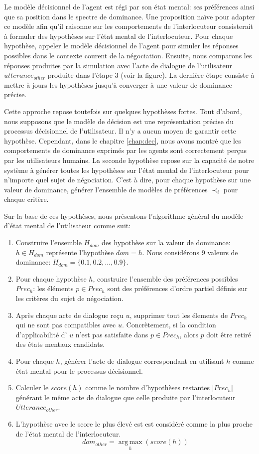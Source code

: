 	Le modèle décisionnel de l'agent est régi par son état mental: ses préférences ainsi que sa position dans le spectre de dominance. Une proposition naïve pour adapter ce modèle afin qu'il raisonne sur les comportements de l'interlocuteur consisterait à formuler des hypothèses sur l'état mental de l'interlocuteur. Pour chaque hypothèse, appeler le modèle décisionnel de l'agent pour simuler les réponses possibles dans le contexte courent de la négociation. Ensuite, nous comparons les réponses produites par la simulation avec l'acte de dialogue de l'utilisateur $utterance_{other}$ produite dans l'étape 3 (voir la figure). 
	La dernière étape consiste à mettre à jours les hypothèses jusqu'à converger à une valeur de dominance précise. 
	
	Cette approche repose toutefois sur quelques hypothèses fortes. Tout d'abord, nous supposons que le modèle de décision est une représentation précise du processus décisionnel de l'utilisateur. Il n'y a aucun moyen de garantir cette hypothèse. Cependant, dans le chapitre \ref{chap:dec}, nous avons montré que les comportements de dominance exprimés par les agents sont correctement perçus par les utilisateurs humains. La seconde hypothèse repose sur la capacité de notre système à générer toutes les hypothèses sur l'état mental de l'interlocuteur pour n'importe quel sujet de négociation. C'est à dire, pour chaque hypothèse sur une valeur de dominance, générer l'ensemble de modèles de préférences $\prec_i$ pour chaque critère.
	
	Sur la base de ces hypothèses, nous présentons l'algorithme général du modèle d'état mental de l'utilisateur comme suit:

		\begin{enumerate}
			\item Construire l'ensemble $H_{dom}$ des hypothèse sur la valeur de dominance: $h\in H_{dom}$ représente l'hypothèse $dom=h$. Nous considérons 9 valeurs de dominance: $H_{dom}=\{0.1, 0.2, \ldots, 0.9\}$.
			\item Pour chaque hypothèse $h$, construire l'ensemble des préférences possibles $Prec_h$: les éléments $p\in Prec_h$ sont des préférences d'ordre partiel définis sur les critères du sujet de négociation.
			
			\item Après chaque acte de dialogue reçu $u$, supprimer tout les élements de $Prec_h$ qui ne sont pas compatibles avec $u$. Concrètement, si la condition d'applicabilité d' $u$ n'est pas satisfaite dans $p \in Prec_h$, alors $p$ doit être retiré des états mentaux candidats.
			\item Pour chaque $h$, générer l'acte de dialogue correspondant en utilisant $h$ comme état mental pour le processus décisionnel.
			\item Calculer le $score(h)$ comme le nombre d'hypothèses restantes $|Prec_h|$ générant le même acte de dialogue que celle produite par l'interlocuteur $Utterance_{other}$. 
			\item 	L'hypothèse avec le score le plus élevé est est considéré comme la plus proche de l'état mental de l'interlocuteur.
			$$dom_{other} = \operatorname*{arg\,max}_{h} (score(h))$$
		\end{enumerate}
		
